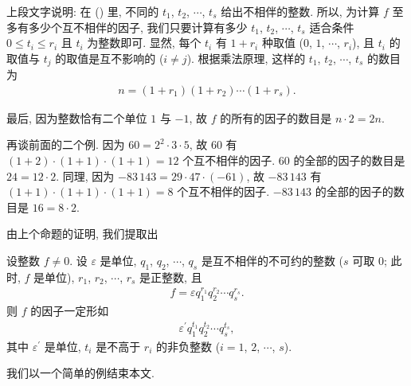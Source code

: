 \begin{pf}
    上段文字说明: 在 () 里, 不同的 $t_1$, $t_2$, $\cdots$, $t_s$ 给出不相伴的整数. 所以, 为计算 $f$ 至多有多少个互不相伴的因子, 我们只要计算有多少 $t_1$, $t_2$, $\cdots$, $t_s$ 适合条件 $0 \leq t_i \leq r_i$ 且 $t_i$ 为整数即可. 显然, 每个 $t_i$ 有 $1 + r_i$ 种取值 ($0$, $1$, $\cdots$, $r_i$), 且 $t_i$ 的取值与 $t_j$ 的取值是互不影响的 ($i \neq j$). 根据乘法原理, 这样的 $t_1$, $t_2$, $\cdots$, $t_s$ 的数目为
    \begin{align*}
        n = (1 + r_1) (1 + r_2) \cdots (1 + r_s).
    \end{align*}

    最后, 因为整数恰有二个单位 $1$ 与 $-1$, 故 $f$ 的所有的因子的数目是 $n \cdot 2 = 2n$.
\end{pf}

\begin{example}
    再谈前面的二个例. 因为 $60 = 2^2 \cdot 3 \cdot 5$, 故 $60$ 有 $(1+2) \cdot (1+1) \cdot (1+1) = 12$ 个互不相伴的因子. $60$ 的全部的因子的数目是 $24 = 12 \cdot 2$. 同理, 因为 $-83\,143 = 29 \cdot 47 \cdot (-61)$, 故 $-83\,143$ 有 $(1+1) \cdot (1+1) \cdot (1+1) = 8$ 个互不相伴的因子. $-83\,143$ 的全部的因子的数目是 $16 = 8 \cdot 2$.
\end{example}

由上个命题的证明, 我们提取出
\begin{proposition}
    设整数 $f \neq 0$. 设 $\varepsilon$ 是单位, $q_1$, $q_2$, $\cdots$, $q_s$ 是互不相伴的不可约的整数 ($s$ 可取 $0$; 此时, $f$ 是单位), $r_1$, $r_2$, $\cdots$, $r_s$ 是正整数, 且
    \begin{align*}
        f = \varepsilon q_1^{r_1} q_2^{r_2} \cdots q_s^{r_s}.
    \end{align*}
    则 $f$ 的因子一定形如
    \begin{align*}
        \varepsilon^{\prime} q_1^{t_1} q_2^{t_2} \cdots q_s^{t_s},
    \end{align*}
    其中 $\varepsilon^{\prime}$ 是单位, $t_i$ 是不高于 $r_i$ 的非负整数 ($i=1$, $2$, $\cdots$, $s$).
\end{proposition}

我们以一个简单的例结束本文.

